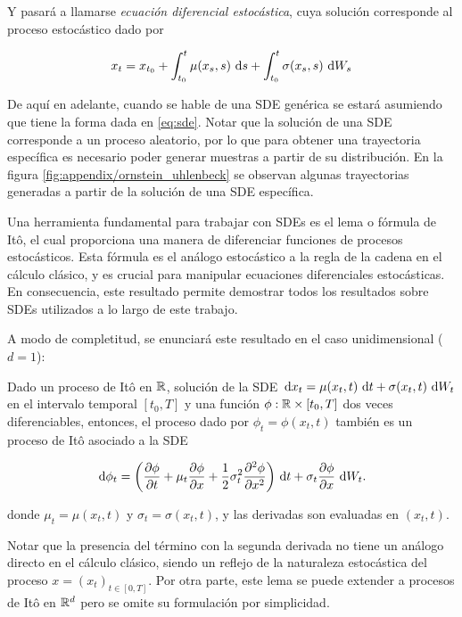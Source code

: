 Y pasará a llamarse \textit{ecuación diferencial estocástica}, cuya solución corresponde al proceso estocástico dado por

\begin{equation*}
    x_t = x_{t_0} + \int_{t_0}^t \mu(x_s,s)\,\operatorname{d}\! s + \int_{t_0}^t \sigma(x_s,s) \,\operatorname{d}\! W_s
\end{equation*}

De aquí en adelante, cuando se hable de una SDE genérica se estará asumiendo que tiene la forma dada en \eqref{eq:sde}. Notar que la solución de una SDE corresponde a un proceso aleatorio, por lo que para obtener una trayectoria específica es necesario poder generar muestras a partir de su distribución. En la figura \ref{fig:appendix/ornstein_uhlenbeck} se observan algunas trayectorias generadas a partir de la solución de una SDE específica.

Una herramienta fundamental para trabajar con SDEs es el lema o fórmula de Itô, el cual proporciona una manera de diferenciar funciones de procesos estocásticos. Esta fórmula es el análogo estocástico a la regla de la cadena en el cálculo clásico, y es crucial para manipular ecuaciones diferenciales estocásticas. En consecuencia, este resultado permite demostrar todos los resultados sobre SDEs utilizados a lo largo de este trabajo.

A modo de completitud, se enunciará este resultado en el caso unidimensional ($d=1$):

\begin{teo}
    \label{teo:itos_formula}
    Dado un proceso de Itô en $\mathbb{R}$, solución de la SDE $\,\operatorname{d}\! x_t = \mu(x_t,t)\,\operatorname{d}\! t + \sigma(x_t,t)\,\operatorname{d}\! W_t$ en el intervalo temporal $[t_0,T]$ y una función $\phi:\mathbb{R}\times [t_0,T]$ dos veces diferenciables, entonces, el proceso dado por $\phi_t = \phi(x_t,t)$ también es un proceso de Itô asociado a la SDE

    \begin{equation}
        \label{eq:itos_formula}
        \,\operatorname{d}\!\phi_t = \left( \frac{\partial\phi}{\partial t} + \mu_t \frac{\partial\phi}{\partial x} + \frac{1}{2} \sigma^2_t \frac{\partial^2\phi}{\partial x^2} \right) \,\operatorname{d}\! t + \sigma_t \frac{\partial\phi}{\partial x} \,\operatorname{d}\! W_t.
    \end{equation}

    donde $\mu_t = \mu(x_t,t)$ y $\sigma_t = \sigma(x_t,t)$, y las derivadas son evaluadas en $(x_t,t)$.

\end{teo}

Notar que la presencia del término con la segunda derivada no tiene un análogo directo en el cálculo clásico, siendo un reflejo de la naturaleza estocástica del proceso $x=(x_t)_{t\in[0,T]}$. Por otra parte, este lema se puede extender a procesos de Itô en $\mathbb{R}^d$ pero se omite su formulación por simplicidad.

